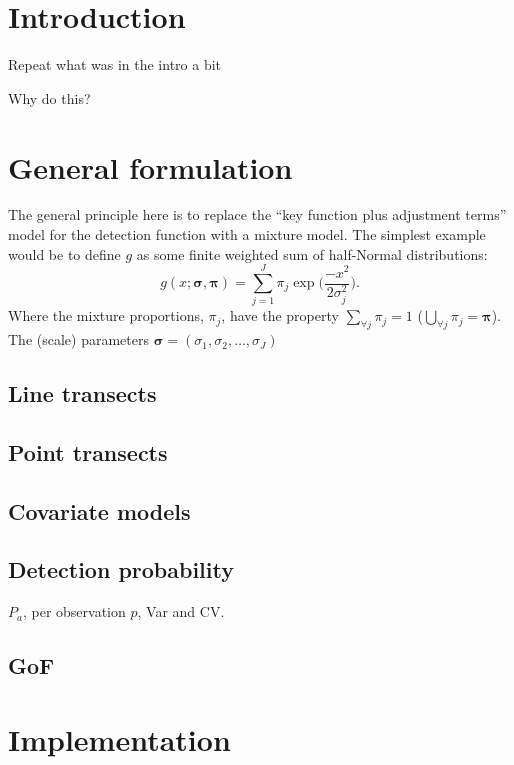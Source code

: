 \section{Introduction}

Repeat what was in the intro a bit

Why do this?

\section{General formulation}

The general principle here is to replace the ``key function plus adjustment terms'' model for the detection function with a mixture model. The simplest example would be to define $g$ as some finite weighted sum of half-Normal distributions:
\begin{equation*}
g(x;\bm{\sigma},\bm{\pi}) = \sum_{j=1}^J \pi_j \exp \Big( \frac{-x^2}{2 \sigma_j^2}\Big).
\end{equation*}
Where the mixture proportions, $\pi_j$, have the property $\sum_{\forall j}\pi_j=1$ ($\bigcup_{\forall j} \pi_j=\bm{\pi}$). The (scale) parameters $\bm{\sigma}=(\sigma_1,\sigma_2,\dots,\sigma_J)$


\subsection{Line transects}

\subsection{Point transects}

\subsection{Covariate models}


\subsection{Detection probability}

$P_a$, per observation $p$, Var and CV.

\subsection{GoF}

\section{Implementation}

